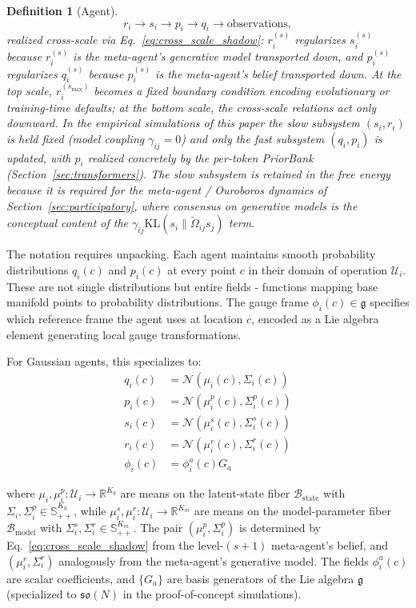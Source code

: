 \documentclass[11pt]{article}
\newtheorem{definition}{Definition}
\begin{document}
\begin{definition}[Agent]
\[
r_i \to s_i \to p_i \to q_i \to \text{observations},
\]
realized cross-scale via Eq.~\eqref{eq:cross_scale_shadow}: $r_i^{(s)}$ regularizes $s_i^{(s)}$ because $r_i^{(s)}$ is the meta-agent's generative model transported down, and $p_i^{(s)}$ regularizes $q_i^{(s)}$ because $p_i^{(s)}$ is the meta-agent's belief transported down. At the top scale, $r_i^{(s_{\max})}$ becomes a fixed boundary condition encoding evolutionary or training-time defaults; at the bottom scale, the cross-scale relations act only downward. In the empirical simulations of this paper the slow subsystem $(s_i, r_i)$ is held fixed (model coupling $\gamma_{ij} = 0$) and only the fast subsystem $(q_i, p_i)$ is updated, with $p_i$ realized concretely by the per-token PriorBank (Section~\ref{sec:transformers}). The slow subsystem is retained in the free energy because it is required for the meta-agent / Ouroboros dynamics of Section~\ref{sec:participatory}, where consensus on generative models is the conceptual content of the $\gamma_{ij}\mathrm{KL}(s_i\|\tilde{\Omega}_{ij}s_j)$ term.
\end{definition}

The notation requires unpacking. Each agent maintains smooth probability distributions $q_i(c)$ and $p_i(c)$ at every point $c$ in their domain of operation $\mathcal{U}_i$. These are not single distributions but entire fields - functions mapping base manifold points to probability distributions. The gauge frame $\phi_i(c) \in \mathfrak{g}$ specifies which reference frame the agent uses at location $c$, encoded as a Lie algebra element generating local gauge transformations.

For Gaussian agents, this specializes to:
\begin{align}
q_i(c) &= \mathcal{N}(\mu_i(c), \Sigma_i(c)) \\
p_i(c) &= \mathcal{N}(\mu_i^p(c), \Sigma_i^p(c)) \\
s_i(c) &= \mathcal{N}(\mu_i^s(c), \Sigma_i^s(c)) \\
r_i(c) &= \mathcal{N}(\mu_i^r(c), \Sigma_i^r(c)) \\
\phi_i(c) &= \phi_i^a(c) G_a
\end{align}

where $\mu_i, \mu_i^p: \mathcal{U}_i \to \mathbb{R}^{K_q}$ are means on the latent-state fiber $\mathcal{B}_{\mathrm{state}}$ with $\Sigma_i, \Sigma_i^p \in \mathbb{S}^{K_q}_{++}$, while $\mu_i^s, \mu_i^r: \mathcal{U}_i \to \mathbb{R}^{K_m}$ are means on the model-parameter fiber $\mathcal{B}_{\mathrm{model}}$ with $\Sigma_i^s, \Sigma_i^r \in \mathbb{S}^{K_m}_{++}$. The pair $(\mu_i^p, \Sigma_i^p)$ is determined by Eq.~\eqref{eq:cross_scale_shadow} from the level-$(s{+}1)$ meta-agent's belief, and $(\mu_i^r, \Sigma_i^r)$ analogously from the meta-agent's generative model. The fields $\phi_i^a(c)$ are scalar coefficients, and $\{G_a\}$ are basis generators of the Lie algebra $\mathfrak{g}$ (specialized to $\mathfrak{so}(N)$ in the proof-of-concept simulations).
\end{document}
